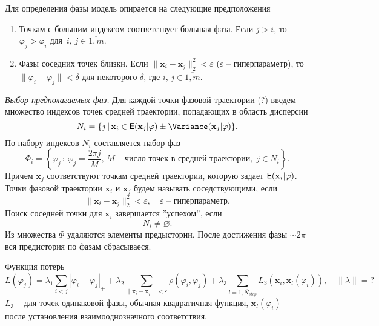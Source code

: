\documentclass[12pt, twoside]{article}
\theoremstyle{definition}
\def\eps{\varepsilon}
\begin{document}

Для определения фазы модель опирается на следующие предположения
\begin{enumerate}
    
    \item Точкам с большим индексом соответствует большая фаза.  
    Если $j > i$, то $\varphi_j > \varphi_i$ для~$i,\, j \in \overline{1, m}$.
    
    \item Фазы соседних точек близки. Если $\| \mathbf{x}_i - \mathbf{x}_j \|_2^2 < \eps$ ($\eps$ -- гиперпараметр), то $\| \varphi_i - \varphi_j \| < \delta$ для некоторого $\delta$, где $i,\, j \in \overline{1, m}$.
\end{enumerate}

\emph{Выбор предполагаемых фаз.}
Для каждой точки фазовой траектории (?) введем множество индексов точек средней траектории, попадающих в область дисперсии \[N_i = \{ j\,|\, \mathbf{x}_i\in\Expect(\mathbf{x}_j|\varphi)\pm\Variance(\mathbf{x}_j|\varphi) \}.\]
По набору индексов $N_i$ составляется набор фаз
    \[ \Phi_i = \left\{ \varphi_j\,:\: \varphi_j = \frac{2\pi j}{M}, \, M \text{ -- число точек в средней траектории}, \; j\in N_i \right\}. \]
Причем $\mathbf{x}_j$ соответствуют точкам средней траектории, которую задает $\mathsf{E}(\mathbf{x}_i|\varphi)$. Точки фазовой траектории $\mathbf{x}_i$ и $\mathbf{x}_j$ будем называть соседствующими, если
    \[ \| \mathbf{x}_i  - \mathbf{x}_j\|_2^2 < \eps, \quad \eps\text{ -- гиперпараметр.}\]
Поиск соседней точки для $\mathbf{x}_i$ завершается ''успехом'', если 
    \[N_i \neq \varnothing. \]
Из множества $\Phi$ удаляются элементы предыстории.
После достижения фазы $\sim 2\pi$ вся предистория по фазам сбрасываеся.

Функция потерь
    \[ L(\varphi_j) = \lambda_1\sum_{i<j}|\varphi_i - \varphi_j|_{+} + \lambda_2\sum_{\| \mathbf{x}_i - \mathbf{x}_j \|<\eps} \rho( \varphi_i , \varphi_j ) + \lambda_3\sum_{l = \overline{1, N_{step}}} L_3(\mathbf{x}_i, \mathbf{x}_l(\varphi_i)), \quad \| \lambda \| = ?\]
$L_3$ -- для точек одинаковой фазы, обычная квадратичная функция, $\mathbf{x}_l(\varphi_i)$ -- после установления взаимооднозначного соответствия.
  
\end{document}
